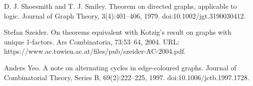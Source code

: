 \par\noindent  [37]  D. J. Shoesmith and T. J. Smiley.  Theorem on directed graphs, applicable to logic.  Journal of Graph Theory, 3(4):401–406, 1979.  doi:10.1002/jgt.3190030412.  
 
\par\noindent  [38]  Stefan Szeider.  On theorems equivalent with Kotzig’s result on graphs with unique 1-factors.  Ars Combinatoria, 73:53–64, 2004.  URL: https://www.ac.tuwien.ac.at/files/pub/szeider-AC-2004.pdf.  
 
\par\noindent  [39]  Anders Yeo.  A note on alternating cycles in edge-coloured graphs.  Journal of Combinatorial Theory, Series B, 69(2):222–225, 1997.  doi:10.1006/jctb.1997.1728.  
  
